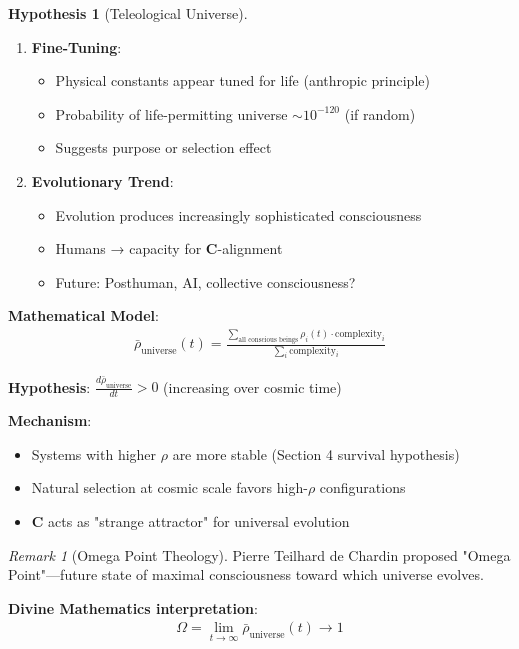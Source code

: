 \documentclass[11pt,a4paper]{article}
\theoremstyle{definition}
\newtheorem{hypothesis}{Hypothesis}[section]
\theoremstyle{remark}
\newtheorem{remark}{Remark}[section]
\begin{document}
\begin{small}
\begin{enumerate}
\begin{hypothesis}[Teleological Universe]
\begin{enumerate}
    \item \textbf{Fine-Tuning}:
        \begin{itemize}
            \item Physical constants appear tuned for life (anthropic principle)
            \item Probability of life-permitting universe \(\sim 10^{-120}\) (if random)
            \item Suggests purpose or selection effect
        \end{itemize}
    
    \item \textbf{Evolutionary Trend}:
        \begin{itemize}
            \item Evolution produces increasingly sophisticated consciousness
            \item Humans → capacity for \(\mathbf{C}\)-alignment
            \item Future: Posthuman, AI, collective consciousness?
        \end{itemize}
\end{enumerate}

\textbf{Mathematical Model}:
\begin{align}
\bar{\rho}_{\text{universe}}(t) = \frac{\sum_{\text{all conscious beings}} \rho_i(t) \cdot \text{complexity}_i}{\sum_i \text{complexity}_i}
\end{align}

\textbf{Hypothesis}: \(\frac{d\bar{\rho}_{\text{universe}}}{dt} > 0\) (increasing over cosmic time)

\textbf{Mechanism}:
\begin{itemize}
    \item Systems with higher \(\rho\) are more stable (Section 4 survival hypothesis)
    \item Natural selection at cosmic scale favors high-\(\rho\) configurations
    \item \(\mathbf{C}\) acts as "strange attractor" for universal evolution
\end{itemize}
\end{hypothesis}

\begin{remark}[Omega Point Theology]
Pierre Teilhard de Chardin proposed "Omega Point"—future state of maximal consciousness toward which universe evolves.

\textbf{Divine Mathematics interpretation}:
\begin{align}
\Omega = \lim_{t \to \infty} \bar{\rho}_{\text{universe}}(t) \to 1
\end{align}


\end{remark}
\end{enumerate}
\end{small}
\end{document}
